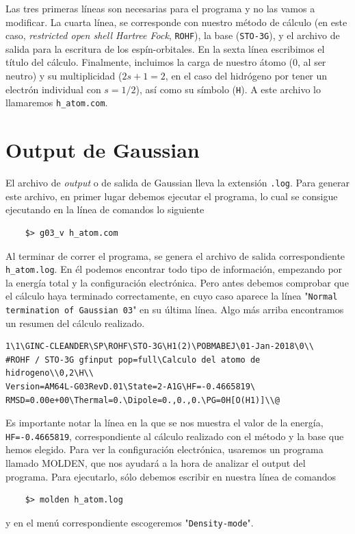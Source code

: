 \documentclass{tufte-book}
\begin{document}
Las tres primeras líneas son necesarias para el programa y 
no las vamos a modificar. La cuarta línea, se corresponde 
con nuestro método de cálculo (en este caso, \textit{restricted
open shell Hartree Fock}, \texttt{ROHF}), la base (\texttt{STO-3G}),
y el archivo de salida para la escritura de los espín-orbitales.
En la sexta línea escribimos el título del  cálculo.
Finalmente, incluimos la carga de nuestro átomo (0, al ser 
neutro) y su multiplicidad ($2s+1=2$, en el caso del hidrógeno
por tener un electrón individual con $s=1/2$), así como su símbolo
(\texttt{H}). A este archivo lo llamaremos \texttt{h\_atom.com}.

\section{Output de Gaussian}
El archivo de \textit{output} o de salida de Gaussian lleva
la extensión \texttt{.log}. Para generar este archivo, en 
primer lugar debemos ejecutar el programa, lo cual se consigue
ejecutando en la línea de comandos lo siguiente
\begin{verbatim}
    $> g03_v h_atom.com
\end{verbatim}
Al terminar de correr el programa, se genera el archivo de salida
correspondiente \texttt{h\_atom.log}. En él podemos encontrar todo
tipo de información, empezando por la energía total y la 
configuración electrónica. Pero antes debemos comprobar que
el cálculo haya terminado correctamente, en cuyo caso aparece la 
línea "\texttt{Normal termination of Gaussian 03}" en su 
última línea. Algo más arriba encontramos un resumen del
cálculo realizado.
\begin{small}
\begin{verbatim}
1\1\GINC-CLEANDER\SP\ROHF\STO-3G\H1(2)\POBMABEJ\01-Jan-2018\0\\
#ROHF / STO-3G gfinput pop=full\Calculo del atomo de hidrogeno\\0,2\H\\
Version=AM64L-G03RevD.01\State=2-A1G\HF=-0.4665819\
RMSD=0.00e+00\Thermal=0.\Dipole=0.,0.,0.\PG=0H[O(H1)]\\@
\end{verbatim}
\end{small}

Es importante notar la línea en la que se nos muestra el valor
de la energía, \texttt{HF=-0.4665819}, correspondiente
al cálculo realizado con el método y la base que hemos elegido.
Para ver la configuración electrónica, usaremos un programa 
llamado MOLDEN, que nos ayudará a la hora de analizar el output
del programa. Para ejecutarlo, sólo debemos escribir en nuestra
línea de comandos
\begin{verbatim}
    $> molden h_atom.log
\end{verbatim}
y en el menú correspondiente escogeremos "\texttt{Density-mode}".
\end{document}
